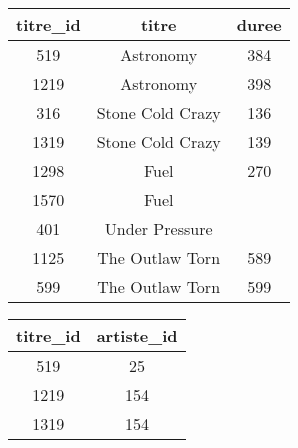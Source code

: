 \documentclass[article,a4paper,firamath,12pt]{nsi}
\begin{document}
\begin{center}
    \small
    \tabstyle[UGLiOrange]
    \begin{tabular}{|c|c|c|}
        \hline
        \rowcolor{UGLiOrange} \color{white}\textbf{titre\_id} & \color{white}\textbf{titre} & \color{white}\textbf{duree} \\
        \hline
        519                                                   & Astronomy                   & \color{white}384            \\
        \hline
        1219                                                  & Astronomy                   & \color{white}398            \\
        \hline
        316                                                   & Stone Cold Crazy            & 136                         \\
        \hline
        1319                                                  & Stone Cold Crazy            & 139                         \\
        \hline
        1298                                                  & \color{white}Fuel           & 270                         \\
        \hline
        1570                                                  & \color{white}Fuel           &                             \\
        \hline
        401                                                   & \color{white}Under Pressure &                             \\
        \hline
        1125                                                  & The Outlaw Torn             & 589                         \\
        \hline
        599                                                   & The Outlaw Torn             & 599                         \\
        \hline
    \end{tabular}\hspace*{1em}
    \begin{tabular}{|c|c|}
        \hline
        \rowcolor{UGLiOrange} \color{white}\textbf{titre\_id} & \color{white}\textbf{artiste\_id} \\
        \hline
        519                                                   & 25                                \\
        \hline
        1219                                                  & 154                               \\
        \hline
        1319                                                  & \color{white}154                  \\

\end{tabular}
\end{center}
\end{document}
